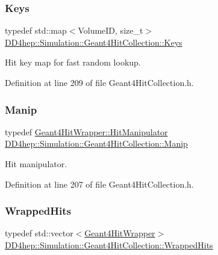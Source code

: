 \subsubsection{\texorpdfstring{Keys}{Keys}}
{\footnotesize\ttfamily typedef std\+::map$<$Volume\+ID, size\+\_\+t$>$ \hyperlink{class_d_d4hep_1_1_simulation_1_1_geant4_hit_collection_a0d4d87fb90cf83dceff0b43928426135}{D\+D4hep\+::\+Simulation\+::\+Geant4\+Hit\+Collection\+::\+Keys}}



Hit key map for fast random lookup. 



Definition at line 209 of file Geant4\+Hit\+Collection.\+h.

\hypertarget{class_d_d4hep_1_1_simulation_1_1_geant4_hit_collection_a7a4b540fa0c4983ebd755a049a2794b7}{}\label{class_d_d4hep_1_1_simulation_1_1_geant4_hit_collection_a7a4b540fa0c4983ebd755a049a2794b7} 
\subsubsection{\texorpdfstring{Manip}{Manip}}
{\footnotesize\ttfamily typedef \hyperlink{class_d_d4hep_1_1_simulation_1_1_geant4_hit_wrapper_1_1_hit_manipulator}{Geant4\+Hit\+Wrapper\+::\+Hit\+Manipulator} \hyperlink{class_d_d4hep_1_1_simulation_1_1_geant4_hit_collection_a7a4b540fa0c4983ebd755a049a2794b7}{D\+D4hep\+::\+Simulation\+::\+Geant4\+Hit\+Collection\+::\+Manip}}



Hit manipulator. 



Definition at line 207 of file Geant4\+Hit\+Collection.\+h.

\hypertarget{class_d_d4hep_1_1_simulation_1_1_geant4_hit_collection_ada2cbec73b2d5005b514a33b44a1dc05}{}\label{class_d_d4hep_1_1_simulation_1_1_geant4_hit_collection_ada2cbec73b2d5005b514a33b44a1dc05} 
\subsubsection{\texorpdfstring{Wrapped\+Hits}{WrappedHits}}
{\footnotesize\ttfamily typedef std\+::vector$<$\hyperlink{class_d_d4hep_1_1_simulation_1_1_geant4_hit_wrapper}{Geant4\+Hit\+Wrapper}$>$ \hyperlink{class_d_d4hep_1_1_simulation_1_1_geant4_hit_collection_ada2cbec73b2d5005b514a33b44a1dc05}{D\+D4hep\+::\+Simulation\+::\+Geant4\+Hit\+Collection\+::\+Wrapped\+Hits}}



